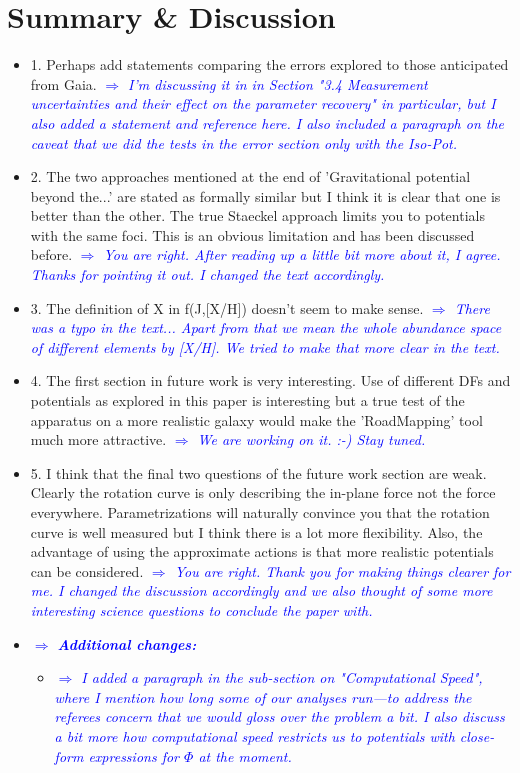 \documentclass[10pt,a4paper]{article}
\newcommand{\Comment}[1]{\textsl{\textcolor{Blue}{$\Longrightarrow$ {#1}}}}
\begin{document}
\section{Summary \& Discussion}
\begin{itemize}
\item 1. Perhaps add statements comparing the errors explored to those anticipated from Gaia. \Comment{I'm discussing it in in Section "3.4 Measurement uncertainties and their effect on the parameter recovery" in particular, but I also added a statement and reference here. I also included a paragraph on the caveat that we did the tests in the error section only with the Iso-Pot.}
\item 2. The two approaches mentioned at the end of 'Gravitational potential beyond the...' are stated as formally similar but I think it is clear that one is better than the other. The true Staeckel approach limits you to potentials with the same foci. This is an obvious limitation and has been discussed before. \Comment{You are right. After reading up a little bit more about it, I agree. Thanks for pointing it out. I changed the text accordingly.}
\item 3. The definition of X in f(J,[X/H]) doesn't seem to make sense. \Comment{There was a typo in the text... Apart from that we mean the whole abundance space of different elements by [X/H]. We tried to make that more clear in the text.}
\item 4. The first section in future work is very interesting. Use of different DFs and potentials as explored in this paper is interesting but a true test of the apparatus on a more realistic galaxy would make the 'RoadMapping' tool much more attractive. \Comment{We are working on it. :-) Stay tuned.}
\item 5. I think that the final two questions of the future work section are weak. Clearly the rotation curve is only describing the in-plane force not the force everywhere. Parametrizations will naturally convince you that the rotation curve is well measured but I think there is a lot more flexibility. Also, the advantage of using the approximate actions is that more realistic potentials can be considered. \Comment{You are right. Thank you for making things clearer for me. I changed the discussion accordingly and we also thought of some more interesting science questions to conclude the paper with.}
\item \Comment{\textbf{Additional changes:}}
\begin{itemize}
\item \Comment{I added a paragraph in the sub-section on "Computational Speed", where I mention how long some of our analyses run---to address the referees concern that we would gloss over the problem a bit. I also discuss a bit more how computational speed restricts us to potentials with close-form expressions for $\Phi$ at the moment.}

\end{itemize}
\end{itemize}
\end{document}
